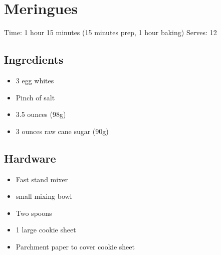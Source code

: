 \section{Meringues}
\label{meringues}
\setcounter{secnumdepth}{0}
Time: 1 hour 15 minutes (15 minutes prep, 1 hour baking)
Serves: 12

\begin{multicols}{2}
\subsection*{Ingredients}
\begin{itemize}
    \item 3 egg whites
    \item Pinch of salt
    \item 3.5 ounces  (98g)
    \item 3 ounces raw cane sugar (90g)
\end{itemize}

\subsection*{Hardware}
\begin{itemize}
    \item Fast stand mixer
    \item small mixing bowl
    \item Two spoons
    \item 1 large cookie sheet
    \item Parchment paper to cover cookie sheet
\end{itemize}
\clearpage


\end{multicols}
